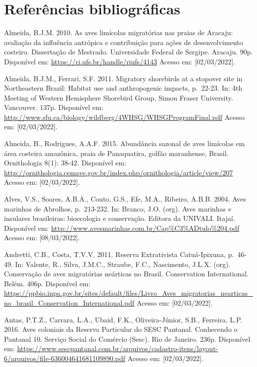 \documentclass[
  oneside]{scrbook}
\begin{document}
\hypertarget{referuxeancias-bibliogruxe1ficas-6}{%
\section{Referências bibliográficas}\label{referuxeancias-bibliogruxe1ficas-6}}

Almeida, B.J.M. 2010. As aves limícolas migratórias nas praias de Aracaju: avaliação da influência antrópica e contribuição para ações de desenvolvimento costeiro. Dissertação de Mestrado. Universidade Federal de Sergipe. Aracaju. 90p. Disponível em: \url{https://ri.ufs.br/handle/riufs/4143} Acesso em: {[}02/03/2022{]}.

Almeida, B.J.M., Ferrari, S.F. 2011. Migratory shorebirds at a stopover site in Northeastern Brazil: Habitat use and anthropogenic impacts, p.~22-23. In: 4th Meeting of Western Hemisphere Shorebird Group. Simon Fraser University. Vancouver. 137p. Disponível em: \url{http://www.sfu.ca/biology/wildberg/4WHSG/WHSGProgramFinal.pdf} Acesso em: {[}02/03/2022{]}.

Almeida, B., Rodrigues, A.A.F. 2015. Abundância sazonal de aves limícolas em área costeira amazônica, praia de Panaquatira, golfão maranhense, Brasil. Ornithologia 8(1): 38-42. Disponível em: \url{http://ornithologia.cemave.gov.br/index.php/ornithologia/article/view/207} Acesso em: {[}02/03/2022{]}.

Alves, V.S., Soares, A.B.A., Couto, G.S., Efe, M.A., Ribeiro, A.B.B. 2004. Aves marinhas de Abrolhos, p.~213-232. In: Branco, J.O. (org). Aves marinhas e insulares brasileiras: bioecologia e conservação. Editora da UNIVALI. Itajaí. Disponível em: \url{http://www.avesmarinhas.com.br/Cap\%C3\%ADtulo\%204.pdf} Acesso em: {[}08/03/2022{]}.

Andretti, C.B., Costa, T.V.V. 2011. Reserva Extrativista Catuá-Ipixuna, p.~46-49. In: Valente, R., Silva, J.M.C., Straube, F.C., Nascimento, J.L.X. (org). Conservação de aves migratórias neárticas no Brasil. Conservation International. Belém. 406p. Disponível em: \url{https://ppbio.inpa.gov.br/sites/default/files/Livro_Aves_migratorias_nearticas_no_brasil_Conservation_International.pdf} Acesso em: {[}02/03/2022{]}.

Antas, P.T.Z., Carrara, L.A., Ubaid, F.K., Oliveira-Júnior, S.B., Ferreira, L.P. 2016. Aves coloniais da Reserva Particular do SESC Pantanal. Conhecendo o Pantanal 10. Serviço Social do Comércio (Sesc). Rio de Janeiro. 236p. Disponível em: \url{https://www.sescpantanal.com.br/arquivos/cadastro-itens/layout-6/arquivos/file-636004641681109890.pdf} Acesso em: {[}02/03/2022{]}.
\end{document}
